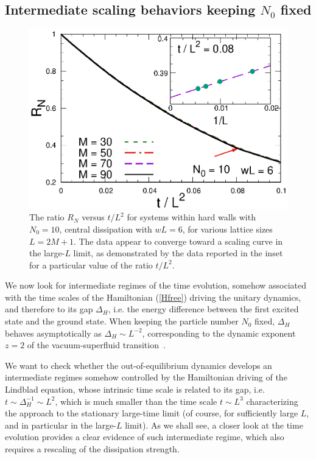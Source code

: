   
  
  
  \subsection{Intermediate scaling behaviors keeping $N_0$ fixed}
  \label{N0fixed}
  
  \begin{figure}[!htb]
\centering
    \includegraphics[width=0.65\columnwidth]{imm/NwL2.eps}
    \caption{The ratio $R_N$ versus $t/L^2$ for systems within hard
      walls with $N_0=10$, central dissipation with $wL=6$, for various
      lattice sizes $L=2M+1$.  The data appear to converge toward a
      scaling curve in the large-$L$ limit, as demonstrated by the data
      reported in the inset for a particular value of the ratio
      $t/L^2$.}
    \label{rntn010ir}
  \end{figure}
  
  We now look for intermediate regimes of the time evolution, somehow
  associated with the time scales of the Hamiltonian (\ref{Hfree})
  driving the unitary dynamics, and therefore to its gap $\Delta_H$,
  i.e. the energy difference between the first excited state and the
  ground state. When keeping the particle number $N_0$ fixed, $\Delta_H$
  behaves asymptotically as $\Delta_H \sim L^{-2}$, corresponding to the
  dynamic exponent $z=2$ of the vacuum-superfluid
  transition~\cite{S99}.
  
  We want to check whether the
    out-of-equilibrium dynamics develops an intermediate regimes somehow
    controlled by the Hamiltonian driving of the Lindblad equation,
    whose intrinsic time scale is related to its gap, i.e. $t \sim
    \Delta_H^{-1}\sim L^2$, which is much smaller than the time scale
    $t\sim L^3$ characterizing the approach to the stationary large-time
    limit (of course, for sufficiently large $L$, and in particular in
    the large-$L$ limit). As we shall see, a closer look at the time
    evolution provides a clear evidence of such intermediate regime, which 
     also requires a rescaling of the dissipation strength.
  
